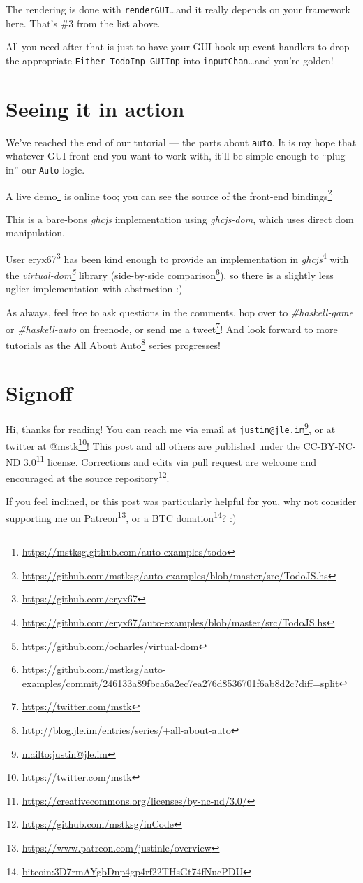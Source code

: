 \documentclass[]{article}
\renewcommand{\href}[2]{#2\footnote{\url{#1}}}
\begin{document}
The rendering is done with \texttt{renderGUI}\ldots and it really depends on
your framework here. That's \#3 from the list above.

All you need after that is just to have your GUI hook up event handlers to drop
the appropriate \texttt{Either\ TodoInp\ GUIInp} into
\texttt{inputChan}\ldots and you're golden!

\hypertarget{seeing-it-in-action}{%
\section{Seeing it in action}\label{seeing-it-in-action}}

We've reached the end of our tutorial --- the parts about \texttt{auto}. It is
my hope that whatever GUI front-end you want to work with, it'll be simple
enough to ``plug in'' our \texttt{Auto} logic.

A \href{https://mstksg.github.com/auto-examples/todo}{live demo} is online too;
you can see
\href{https://github.com/mstksg/auto-examples/blob/master/src/TodoJS.hs}{the
source of the front-end bindings}

This is a bare-bons \emph{ghcjs} implementation using \emph{ghcjs-dom}, which
uses direct dom manipulation.

User \href{https://github.com/eryx67}{eryx67} has been kind enough to provide
\href{https://github.com/eryx67/auto-examples/blob/master/src/TodoJS.hs}{an
implementation in \emph{ghcjs}} with the
\emph{\href{https://github.com/ocharles/virtual-dom}{virtual-dom}} library
(\href{https://github.com/mstksg/auto-examples/commit/246133a89fbca6a2ec7ea276d8536701f6ab8d2c?diff=split}{side-by-side
comparison}), so there is a slightly less uglier implementation with abstraction
:)

As always, feel free to ask questions in the comments, hop over to
\emph{\#haskell-game} or \emph{\#haskell-auto} on freenode, or send me a
\href{https://twitter.com/mstk}{tweet}! And look forward to more tutorials as
the \href{http://blog.jle.im/entries/series/+all-about-auto}{All About Auto}
series progresses!

\hypertarget{signoff}{%
\section{Signoff}\label{signoff}}

Hi, thanks for reading! You can reach me via email at
\href{mailto:justin@jle.im}{\nolinkurl{justin@jle.im}}, or at twitter at
\href{https://twitter.com/mstk}{@mstk}! This post and all others are published
under the \href{https://creativecommons.org/licenses/by-nc-nd/3.0/}{CC-BY-NC-ND
3.0} license. Corrections and edits via pull request are welcome and encouraged
at \href{https://github.com/mstksg/inCode}{the source repository}.

If you feel inclined, or this post was particularly helpful for you, why not
consider \href{https://www.patreon.com/justinle/overview}{supporting me on
Patreon}, or a \href{bitcoin:3D7rmAYgbDnp4gp4rf22THsGt74fNucPDU}{BTC donation}?
:)
\end{document}
